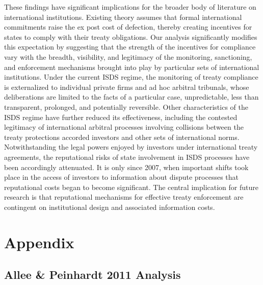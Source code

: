 \documentclass[12pt,onesided]{amsart}
\begin{document}
These findings have significant implications for the broader body of literature on international institutions. Existing theory assumes that formal international commitments raise the ex post cost of defection, thereby creating incentives for states to comply with their treaty obligations. Our analysis significantly modifies this expectation by suggesting that the strength of the incentives for compliance vary with the breadth, visibility, and legitimacy of the monitoring, sanctioning, and enforcement mechanisms brought into play by particular sets of international institutions. Under the current ISDS regime, the monitoring of treaty compliance is externalized to individual private firms and ad hoc arbitral tribunals, whose deliberations are limited to the facts of a particular case, unpredictable, less than transparent, prolonged, and potentially reversible. Other characteristics of the ISDS regime have further reduced its effectiveness, including the contested legitimacy of international arbitral processes involving collisions between the treaty protections accorded investors and other sets of international norms. Notwithstanding the legal powers enjoyed by investors under international treaty agreements, the reputational risks of state involvement in ISDS processes have been accordingly attenuated. It is only since 2007, when important shifts took place in the access of investors to information about dispute processes that reputational costs began to become significant. The central implication for future research is that reputational mechanisms for effective treaty enforcement are contingent on institutional design and associated information costs. 

\newpage






\newpage

\section*{Appendix}
\label{appendix}

\appendix
\setcounter{figure}{0} \renewcommand{\thefigure}{A.\arabic{figure}}
\setcounter{table}{0} \renewcommand{\thetable}{A.\arabic{table}}

\subsection*{Allee \& Peinhardt 2011 Analysis}
\end{document}
